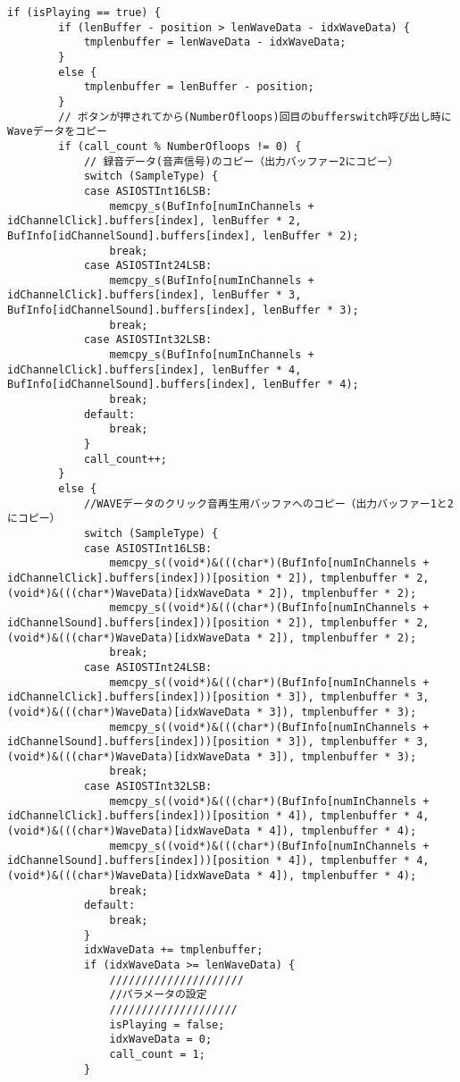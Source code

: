 \begin{lstlisting}[caption=main.cpp]
	if (isPlaying == true) {
		if (lenBuffer - position > lenWaveData - idxWaveData) {
			tmplenbuffer = lenWaveData - idxWaveData;
		}
		else {
			tmplenbuffer = lenBuffer - position;
		}
		// ボタンが押されてから(NumberOfloops)回目のbufferswitch呼び出し時にWaveデータをコピー
		if (call_count % NumberOfloops != 0) {
			// 録音データ(音声信号)のコピー（出力バッファー2にコピー）
			switch (SampleType) {
			case ASIOSTInt16LSB:
				memcpy_s(BufInfo[numInChannels + idChannelClick].buffers[index], lenBuffer * 2, BufInfo[idChannelSound].buffers[index], lenBuffer * 2);
				break;
			case ASIOSTInt24LSB:
				memcpy_s(BufInfo[numInChannels + idChannelClick].buffers[index], lenBuffer * 3, BufInfo[idChannelSound].buffers[index], lenBuffer * 3);
				break;
			case ASIOSTInt32LSB:
				memcpy_s(BufInfo[numInChannels + idChannelClick].buffers[index], lenBuffer * 4, BufInfo[idChannelSound].buffers[index], lenBuffer * 4);
				break;
			default:
				break;
			}
			call_count++;
		}
		else {
			//WAVEデータのクリック音再生用バッファへのコピー（出力バッファー1と2にコピー）
			switch (SampleType) {
			case ASIOSTInt16LSB:
				memcpy_s((void*)&(((char*)(BufInfo[numInChannels + idChannelClick].buffers[index]))[position * 2]), tmplenbuffer * 2, (void*)&(((char*)WaveData)[idxWaveData * 2]), tmplenbuffer * 2);
				memcpy_s((void*)&(((char*)(BufInfo[numInChannels + idChannelSound].buffers[index]))[position * 2]), tmplenbuffer * 2, (void*)&(((char*)WaveData)[idxWaveData * 2]), tmplenbuffer * 2);
				break;
			case ASIOSTInt24LSB:
				memcpy_s((void*)&(((char*)(BufInfo[numInChannels + idChannelClick].buffers[index]))[position * 3]), tmplenbuffer * 3, (void*)&(((char*)WaveData)[idxWaveData * 3]), tmplenbuffer * 3);
				memcpy_s((void*)&(((char*)(BufInfo[numInChannels + idChannelSound].buffers[index]))[position * 3]), tmplenbuffer * 3, (void*)&(((char*)WaveData)[idxWaveData * 3]), tmplenbuffer * 3);
				break;
			case ASIOSTInt32LSB:
				memcpy_s((void*)&(((char*)(BufInfo[numInChannels + idChannelClick].buffers[index]))[position * 4]), tmplenbuffer * 4, (void*)&(((char*)WaveData)[idxWaveData * 4]), tmplenbuffer * 4);
				memcpy_s((void*)&(((char*)(BufInfo[numInChannels + idChannelSound].buffers[index]))[position * 4]), tmplenbuffer * 4, (void*)&(((char*)WaveData)[idxWaveData * 4]), tmplenbuffer * 4);
				break;
			default:
				break;
			}
			idxWaveData += tmplenbuffer;
			if (idxWaveData >= lenWaveData) {
				/////////////////////
				//パラメータの設定
				////////////////////
				isPlaying = false;
				idxWaveData = 0;
				call_count = 1;
			}
			

\end{lstlisting}
